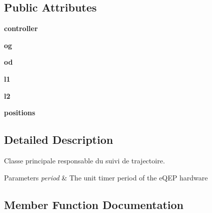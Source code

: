 \subsection*{Public Attributes}
\begin{DoxyCompactItemize}
\item 
{\bfseries controller}\hypertarget{classwakanda_1_1Wakanda_afa13c93d1acb04864ffb955670283f3f}{}\label{classwakanda_1_1Wakanda_afa13c93d1acb04864ffb955670283f3f}

\item 
{\bfseries og}\hypertarget{classwakanda_1_1Wakanda_aa8f99260cf4c31f0568aeabce94eb730}{}\label{classwakanda_1_1Wakanda_aa8f99260cf4c31f0568aeabce94eb730}

\item 
{\bfseries od}\hypertarget{classwakanda_1_1Wakanda_a0ffaac6b73ad8a383d669882bfaff80e}{}\label{classwakanda_1_1Wakanda_a0ffaac6b73ad8a383d669882bfaff80e}

\item 
{\bfseries l1}\hypertarget{classwakanda_1_1Wakanda_a0adce3e75ec43f53a88d3f8d52cc01e2}{}\label{classwakanda_1_1Wakanda_a0adce3e75ec43f53a88d3f8d52cc01e2}

\item 
{\bfseries l2}\hypertarget{classwakanda_1_1Wakanda_ac14b24f1212b25550698d56a861dc63a}{}\label{classwakanda_1_1Wakanda_ac14b24f1212b25550698d56a861dc63a}

\item 
{\bfseries positions}\hypertarget{classwakanda_1_1Wakanda_a968f66cd49217b9762b1eeaca9eeef74}{}\label{classwakanda_1_1Wakanda_a968f66cd49217b9762b1eeaca9eeef74}

\end{DoxyCompactItemize}


\subsection{Detailed Description}
Classe principale responsable du suivi de trajectoire. 


\begin{DoxyParams}{Parameters}
{\em period} & The unit timer period of the e\+Q\+EP hardware \\
\hline
\end{DoxyParams}


\subsection{Member Function Documentation}
